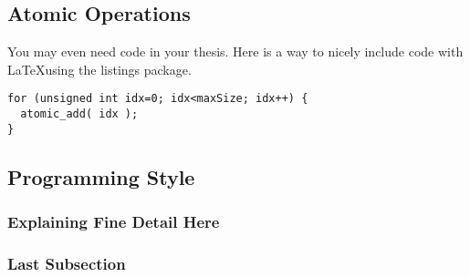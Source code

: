\subsection{Atomic Operations}

You may even need code in your thesis. Here is a way to nicely include code with \LaTeX using the listings package.
\begin{lstlisting}
for (unsigned int idx=0; idx<maxSize; idx++) {
  atomic_add( idx );
}
\end{lstlisting}

\subsection{Programming Style}
\subsubsection{Explaining Fine Detail Here}

\subsubsection{Last Subsection}
